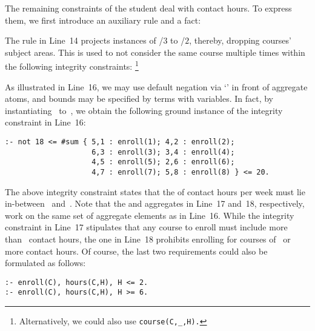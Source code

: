 \begin{example}
The remaining constraints of the student deal with contact hours.
To express them, we first introduce an auxiliary rule and a fact:
%

%
The rule in Line~14 projects instances of /$3$ to
/$2$, thereby, dropping courses' subject areas.
This is used to not consider the same course multiple times within the following
integrity constraints:%
\footnote{Alternatively, we could also use \lstinline{course(C,_,H).}}
%

%
As illustrated in Line~16,
we may use default negation via `' in front of aggregate atoms,
and bounds may be specified by terms with variables.
In fact, by instantiating~ to~,
we obtain the following ground instance of the integrity constraint in Line~16:
%
\begin{lstlisting}[firstnumber=16,stepnumber=16]
:- not 18 <= #sum { 5,1 : enroll(1); 4,2 : enroll(2);
                    6,3 : enroll(3); 3,4 : enroll(4);
                    4,5 : enroll(5); 2,6 : enroll(6);
                    4,7 : enroll(7); 5,8 : enroll(8) } <= 20.
\end{lstlisting}
%
The above integrity constraint states that the  of contact hours per week
must lie in-between~ and~.
Note that the  and  aggregates in Line~17 and~18, respectively,
work on the same set of aggregate elements as in Line~16.
While the integrity constraint in Line~17 stipulates that any course to enroll
must include more than~ contact hours,
the one in Line~18 prohibits enrolling for courses of~ or more contact hours.
Of course, the last two requirements could also be formulated as follows:
%
\begin{lstlisting}[firstnumber=17]
:- enroll(C), hours(C,H), H <= 2.
:- enroll(C), hours(C,H), H >= 6.
\end{lstlisting}


\end{example}
